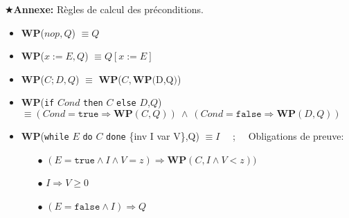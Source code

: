 \documentclass[10pt]{article}\usepackage[correction,nu]{esial}
\newcommand{\WP}[1]{\textbf{WP}($#1$)}
\begin{document}


\bigskip
\noindent\hspace{-1.3em}$\bigstar$\textbf{Annexe:} Règles de calcul des
préconditions. 

\begin{itemize}
\item \WP{nop, Q}  $\equiv Q$
\item \WP{x:=E, Q} $\equiv Q[x:=E]$
\item \WP{C;D, Q}  $\equiv$ \WP{C, \WP{D,Q}}
\item \textbf{WP}(\texttt{if} $Cond$ \texttt{then} $C$ \texttt{else} $D$,$Q$)
  $\equiv (Cond=\mathtt{true}\Rightarrow \mathbf{WP}(C,Q))~\wedge~
          (Cond=\mathtt{false}\Rightarrow \mathbf{WP}(D,Q))$
\item \textbf{WP}(\texttt{while} $E$ \texttt{do} $C$ \texttt{done} \{inv I var
  V\},Q)  $\equiv I$ ~~;~~  Obligations de preuve:
  \begin{enumerate}
  \item[$\bullet$] $(E=\mathtt{true}\wedge I\wedge V=z) \Rightarrow
    \mathbf{WP}(C,I\wedge V<z))$
  \item[$\bullet$] $I\Rightarrow V\geq 0$
  \item[$\bullet$] $(E=\mathtt{false}\wedge I) \Rightarrow Q$
  \end{enumerate}
\end{itemize}
\end{document}
